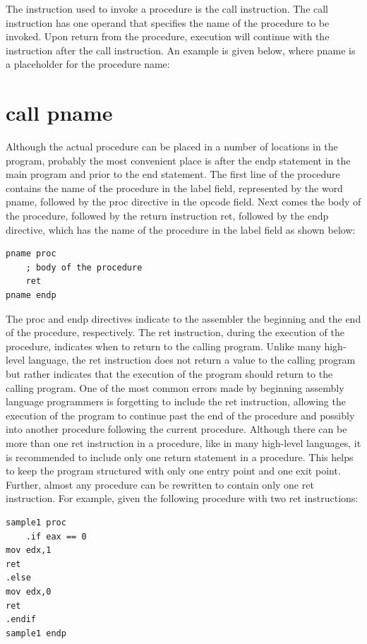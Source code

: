 \documentclass[10pt]{book}
\begin{document}
The instruction used to invoke a procedure is the call instruction. The call instruction has one operand that specifies the name of the procedure to be invoked. Upon return from the procedure, execution will continue with the instruction after the call instruction. An example is given below, where pname is a placeholder for the procedure name:

\section{call pname}
Although the actual procedure can be placed in a number of locations in the program, probably the most convenient place is after the endp statement in the main program and prior to the end statement. The first line of the procedure contains the name of the procedure in the label field, represented by the word pname, followed by the proc directive in the opcode field. Next comes the body of the procedure, followed by the return instruction ret, followed by the endp directive, which has the name of the procedure in the label field as shown below:

\begin{verbatim}
pname proc
    ; body of the procedure
    ret
pname endp
\end{verbatim}

The proc and endp directives indicate to the assembler the beginning and the end of the procedure, respectively. The ret instruction, during the execution of the procedure, indicates when to return to the calling program. Unlike many high-level language, the ret instruction does not return a value to the calling program but rather indicates that the execution of the program should return to the calling program. One of the most common errors made by beginning assembly language programmers is forgetting to include the ret instruction, allowing the execution of the program to continue past the end of the procedure and possibly into another procedure following the current procedure. Although there can be more than one ret instruction in a procedure, like in many high-level languages, it is recommended to include only one return statement in a procedure. This helps to keep the program structured with only one entry point and one exit point. Further, almost any procedure can be rewritten to contain only one ret instruction. For example, given the following procedure with two ret instructions:

\begin{verbatim}
sample1 proc
    .if eax == 0
mov edx,1
ret
.else
mov edx,0
ret
.endif
sample1 endp
\end{verbatim}
\end{document}
